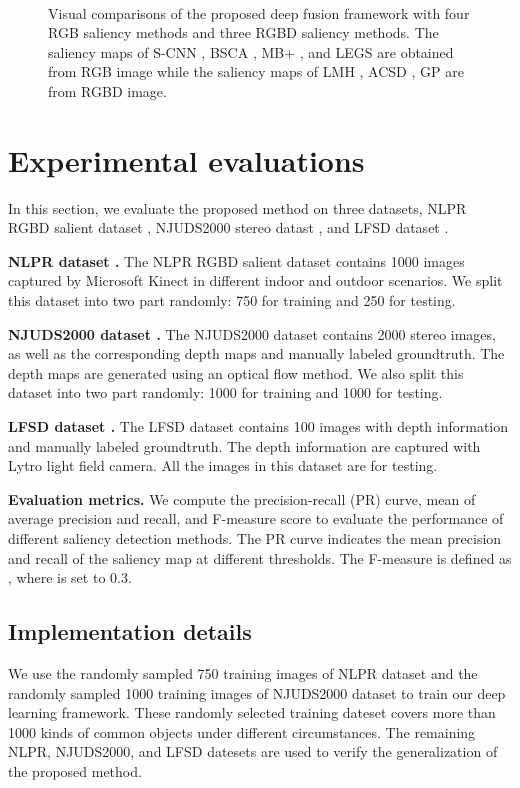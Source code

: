 \documentclass[journal]{IEEEtran}
\def\hspacefigure{\hspace{-0.8mm}}
\def\widthtwelve{0.086\linewidth}
\begin{document}
\begin{figure*}[t]
 \hspacefigure
{} \hspacefigure\\
  \caption{Visual comparisons of the proposed deep fusion framework with four RGB saliency methods and three RGBD saliency methods. The saliency maps of S-CNN \cite{he2015supercnn}, BSCA \cite{qin2015saliency}, MB+ \cite{zhang2015MBD}, and LEGS \cite{wang2015deep} are obtained from RGB image while the saliency maps of LMH \cite{peng2014rgbd}, ACSD \cite{ju2014depth}, GP \cite{ren2015exploiting} are from RGBD image.}
\label{fig:saliency2}
\end{figure*}

\section{Experimental evaluations}
In this section, we evaluate the proposed method on three datasets, NLPR RGBD salient dataset \cite{peng2014rgbd}, NJUDS2000 stereo datast \cite{ju2014depth}, and LFSD dataset \cite{Li_2014_CVPR}.

\textbf{NLPR dataset \cite{peng2014rgbd}.}
The NLPR RGBD salient dataset \cite{peng2014rgbd} contains 1000 images captured by Microsoft Kinect in different indoor and outdoor scenarios. We split this dataset into two part randomly: 750 for training and 250 for testing.

\textbf{NJUDS2000 dataset \cite{ju2014depth}.}
The NJUDS2000 dataset contains 2000 stereo images, as well as the corresponding depth maps and manually labeled groundtruth. The depth maps are generated using an optical flow method.
We also split this dataset into two part randomly: 1000 for training and 1000 for testing.

\textbf{LFSD dataset \cite{Li_2014_CVPR}.}
The LFSD dataset \cite{Li_2014_CVPR} contains 100 images with depth information and manually labeled groundtruth. The depth information are captured with Lytro light field camera. All the images in this dataset are for testing.

\textbf{Evaluation metrics.} We compute the precision-recall (PR) curve, mean of average precision and recall, and F-measure score to evaluate the performance of different saliency detection methods. The PR curve indicates the mean precision and recall of the saliency map at different thresholds. The F-measure is defined as , where  is set to 0.3.

\subsection{Implementation details}
We use the randomly sampled 750 training images of NLPR dataset \cite{peng2014rgbd} and the randomly sampled 1000 training images of NJUDS2000 dataset \cite{ju2014depth} to train our deep learning framework. These randomly selected training dateset covers more than 1000 kinds of common objects under different circumstances. The remaining NLPR, NJUDS2000, and LFSD datesets are used to verify the generalization of the proposed method.
\end{document}
